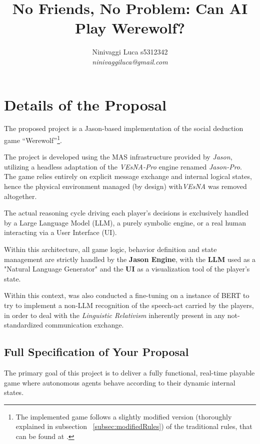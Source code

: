 \documentclass[12pt]{article}
\begin{document}
\title{No Friends, No Problem: Can AI Play Werewolf?}
\author{Ninivaggi Luca s5312342\\
{\em ninivaggiluca@gmail.com}}
\date{}
\maketitle        

\section{Details of the Proposal}
\label{sec:yourProposal}

The proposed project is a Jason-based implementation of the social deduction game ``Werewolf''\footnote{The implemented game follows a slightly modified version (thoroughly explained in subsection ~\ref{subsec:modifiedRules}) of the traditional rules, that can be found at \cite{mafia_wiki}.}.

The project is developed using the MAS infrastructure provided by \emph{Jason}, utilizing a headless adaptation of the \emph{VEsNA-Pro} engine renamed \emph{Jason-Pro}. The game relies entirely on explicit message exchange and internal  logical states, hence the physical environment managed (by design) with\emph{VEsNA} was removed altogether. 

The actual reasoning cycle driving each player's decisions is exclusively handled by a Large Language Model (LLM), a purely symbolic engine, or a real human interacting via a User Interface (UI). 

Within this architecture, all game logic, behavior definition  and state management are strictly handled by the \textbf{Jason Engine}, with the \textbf{LLM} used as a "Natural Language Generator" and the \textbf{UI} as a visualization tool of the player's state.

Within this context, was also conducted a fine-tuning on a instance of BERT\cite{devlin-etal-2019-bert} to try to implement a non-LLM recognition of the speech-act carried by the players, in order to deal with the \emph{Linguistic  Relativism} inherently present in any not-standardized communication exchange.

\subsection{Full Specification of Your Proposal}
\label{subsec:specification}

The primary goal of this project is to deliver a fully functional, real-time playable game where autonomous agents behave according to their dynamic internal states. 
\end{document}
